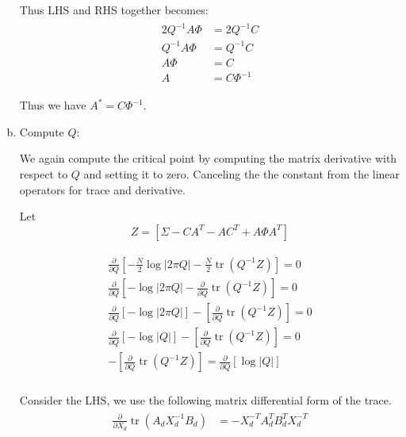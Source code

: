 \documentclass{tufte-handout}
\begin{document}
\begin{enumerate}[(a)]
    Thus LHS and RHS together becomes: 
    \begin{multline}
        \begin{aligned}
            2 Q^{-1} A \Phi &= 2 Q^{-1} C \\
            Q^{-1} A \Phi &=  Q^{-1} C \\
            A \Phi &=  C \\
            A &=  C \Phi^{-1} 
        \end{aligned}
    \end{multline}        

    Thus we have $A^{*} = C \Phi^{-1} $.
    
    \item Compute $Q$:

    We again compute the critical point by computing the matrix derivative with respect to $Q$ and setting it to zero. Canceling the the constant
    from the linear operators for trace and derivative.
    
    Let $$Z =  \left[  \Sigma -  CA^{T} - A C^T + A \Phi A^T \right]$$

    \begin{multline}
        \begin{aligned}
           \frac{\partial} {\partial Q} \left[ -\frac{N}{2} \log |2\pi Q|  - \frac{N}{2} \operatorname{tr} \left( Q^{-1} Z \right)\right] = 0 \\
           \frac{\partial} {\partial Q} \left[ -\log |2\pi Q|  - \frac{\partial} {\partial Q} \operatorname{tr} \left( Q^{-1}  Z\right)\right] = 0 \\
           \frac{\partial} {\partial Q} \left[ -\log |2\pi Q| \right]  - \left[ \frac{\partial} {\partial Q} \operatorname{tr} \left( Q^{-1} Z \right) \right] = 0 \\
           \frac{\partial} {\partial Q} \left[ -\log |Q| \right]  - \left[ \frac{\partial} {\partial Q} \operatorname{tr} \left( Q^{-1} Z \right) \right] = 0 \\
           -\left[ \frac{\partial} {\partial Q} \operatorname{tr} \left( Q^{-1} Z \right) \right] = \frac{\partial} {\partial Q} \left[ \log |Q| \right]   \\ 
        \end{aligned}
    \end{multline}
   
    Consider the LHS, we use the following matrix differential form of the trace.
    \begin{multline}
        \begin{aligned}
            \frac{\partial}{\partial X_d} \operatorname{tr}(A_{d}X_{d}^{-1}B_{d}) &= -X_d^{-T}A_d^{T} B_d^T X_d^{-T}
        \end{aligned}
    \end{multline} 


\end{enumerate}
\end{document}
